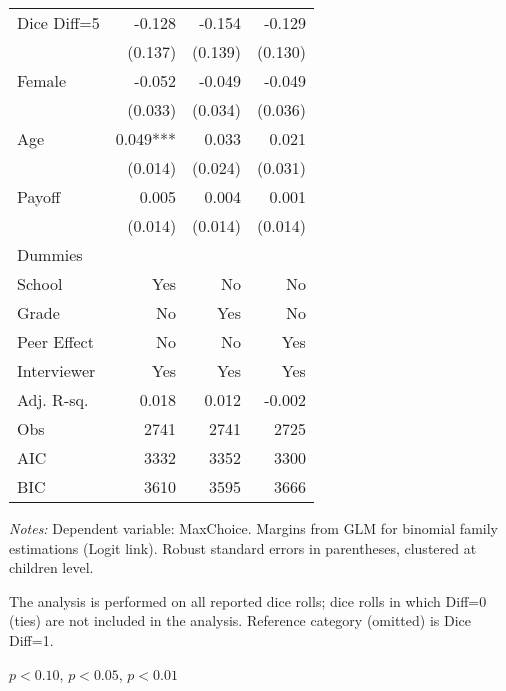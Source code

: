 \begin{table}[htbp]
\begin{threeparttable}
\begin{tabular}{l*{3}{D{.}{.}{-1}}}
Dice Diff=5         &              -0.128   &              -0.154   &              -0.129   \\
                    &             (0.137)   &             (0.139)   &             (0.130)   \\
Female              &              -0.052   &              -0.049   &              -0.049   \\
                    &             (0.033)   &             (0.034)   &             (0.036)   \\
Age                 &               0.049***&               0.033   &               0.021   \\
                    &             (0.014)   &             (0.024)   &             (0.031)   \\
Payoff              &               0.005   &               0.004   &               0.001   \\
                    &             (0.014)   &             (0.014)   &             (0.014)   \\ \midrule 
Dummies &&& \\
School      &                 Yes   &                  No   &                  No   \\
Grade       &                  No   &                 Yes   &                  No   \\
Peer Effect &                  No   &                  No   &                 Yes  \\
Interviewer &                 Yes   &                 Yes   &                 Yes   \\
\midrule
Adj. R-sq.          &               0.018   &                0.012  &                 -0.002      \\
Obs                 &                2741   &                2741   &                2725   \\
AIC                 &                3332   &                3352   &                3300   \\
BIC                 &                3610   &                3595   &                3666   \\
\bottomrule
\end{tabular}
\begin{tablenotes}
\footnotesize
\textit{Notes:} Dependent variable: MaxChoice. Margins from GLM for binomial family estimations (Logit link). Robust standard errors in parentheses, clustered at children level.
\item The analysis is performed on all reported dice rolls; dice rolls in which Diff=0 (ties) are not included in the analysis. Reference category (omitted) is Dice Diff=1.

\item \sym{*} \(p<0.10\), \sym{**} \(p<0.05\), \sym{***} \(p<0.01\)
\end{tablenotes}
\end{threeparttable}
\label{tab:cheat_patterns}
\end{table}
